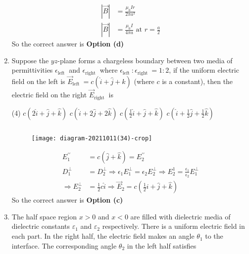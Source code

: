 \begin{enumerate}
\begin{answer}
\begin{figure}[H]
	\end{figure}
	\begin{align*}
	|\vec{B}|&=\frac{\mu_{0} I r}{2 \pi a^{2}}\\
	|\vec{B}|&=\frac{\mu_{0} I}{4 \pi a}\text{ at }r=\frac{a}{2}
	\end{align*}
	So the correct answer is \textbf{Option (d)}
\end{answer}
	\item Suppose the $y z$-plane forms a chargeless boundary between two media of permittivities $\epsilon_{\text {left }}$ and $\epsilon_{\text {right }}$ where $\epsilon_{\text {left }}: \epsilon_{\text {right }}=1: 2$, if the uniform electric field on the left is $\vec{E}_{\text {left }}=c(\hat{i}+\hat{j}+\hat{k})$ (where $c$ is a constant), then the electric field on the right $\vec{E}_{\text {right }}$ is
	{}
	\begin{tasks}(4)
		\task[\textbf{a.}]  $c(2 \hat{i}+\hat{j}+\hat{k})$
		\task[\textbf{b.}] $c(\hat{i}+2 \hat{j}+2 \hat{k})$
		\task[\textbf{c.}] $c\left(\frac{1}{2} \hat{i}+\hat{j}+\hat{k}\right)$
		\task[\textbf{d.}] $c\left(\hat{i}+\frac{1}{2} \hat{j}+\frac{1}{2} \hat{k}\right)$
	\end{tasks}
\begin{answer}$\left. \right. $
	\begin{figure}[H]
		\centering
		\texttt{[image: diagram-20211011(34)-crop]}
	\end{figure}
	\begin{align*}
	E_{1}^{\prime \prime}&=c(\hat{j}+\hat{k})=E_{2}^{\prime \prime}\\
	D_{1}^{\perp}&=D_{2}^{\perp} \Rightarrow \epsilon_{1} E_{1}^{\perp}=\epsilon_{2} E_{2}^{\perp} \Rightarrow E_{2}^{1}=\frac{\epsilon_{1}}{\epsilon_{2}} E_{1}^{\perp}\\
	\Rightarrow E_{2}^{\perp}&=\frac{1}{2} c \hat{i} \Rightarrow \vec{E}_{2}=c\left(\frac{1}{2} \hat{i}+\hat{j}+\hat{k}\right)
	\end{align*}
	So the correct answer is \textbf{Option (c)}
\end{answer}
	\item  The half space region $x>0$ and $x<0$ are filled with dielectric media of dielectric constants $\varepsilon_{1}$ and $\varepsilon_{2}$ respectively. There is a uniform electric field in each part. In the right half, the electric field makes an angle $\theta_{1}$ to the interface. The corresponding angle $\theta_{2}$ in the left half satisfies
	{{}}

\end{enumerate}

